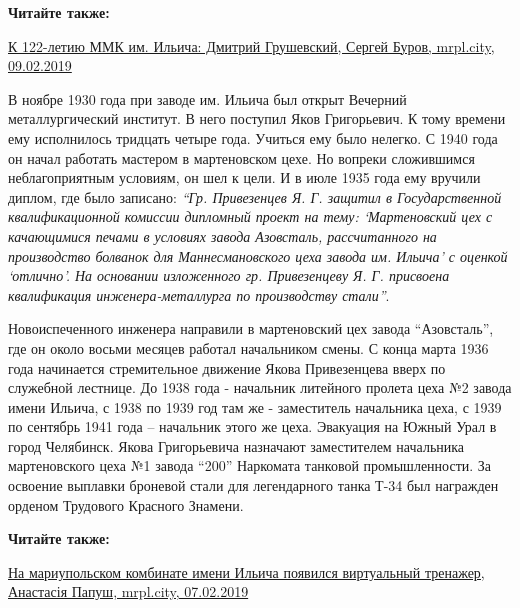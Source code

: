 \vspace{0.5cm}
\begin{minipage}{0.9\textwidth}
\textbf{Читайте также:}

\href{https://archive.org/details/09_02_2019.sergij_burov.mrpl_city.k_122_letiu_mmk_im_iljicha_dmitrii_grushevskii}{%
К 122-летию ММК им. Ильича: Дмитрий Грушевский, Сергей Буров, mrpl.city, 09.02.2019}
\end{minipage}
\vspace{0.5cm}

В ноябре 1930 года при заводе им. Ильича был открыт Вечерний металлургический
институт. В него поступил Яков Григорьевич. К тому времени ему исполнилось
тридцать четыре года. Учиться ему было нелегко. С 1940 года он начал работать
мастером в мартеновском цехе. Но вопреки сложившимся неблагоприятным условиям,
он шел к цели. И в июле 1935 года ему вручили диплом, где было записано: \emph{\enquote{Гр.
Привезенцев Я. Г. защитил в Государственной квалификационной комиссии дипломный
проект на тему: \enquote{Мартеновский цех с качающимися печами в условиях завода
Азовсталь, рассчитанного на производство болванок для Маннесмановского цеха
завода им. Ильича} с оценкой \enquote{отлично}. На основании изложенного гр.
Привезенцеву Я. Г. присвоена квалификация инженера-металлурга по производству
стали}}.

Новоиспеченного инженера направили в мартеновский цех завода \enquote{Азовсталь}, где
он около восьми месяцев работал начальником смены. С конца марта 1936 года
начинается стремительное движение Якова Привезенцева вверх по служебной
лестнице. До 1938 года - начальник литейного пролета цеха №2 завода имени
Ильича, с 1938 по 1939 год там же - заместитель начальника цеха, с 1939 по
сентябрь 1941 года – начальник этого же цеха. Эвакуация на Южный Урал в город
Челябинск. Якова Григорьевича назначают заместителем начальника мартеновского
цеха №1 завода \enquote{200} Наркомата танковой промышленности. За освоение выплавки
броневой стали для легендарного танка Т-34 был награжден орденом Трудового
Красного Знамени.

\textbf{Читайте также:} 

\href{https://mrpl.city/news/view/na-mariupolskom-kombinate-imeni-ilicha-poyavilsya-virtualnyj-trenazher-foto}{%
На мариупольском комбинате имени Ильича появился виртуальный тренажер, Анастасія Папуш, mrpl.city, 07.02.2019}


